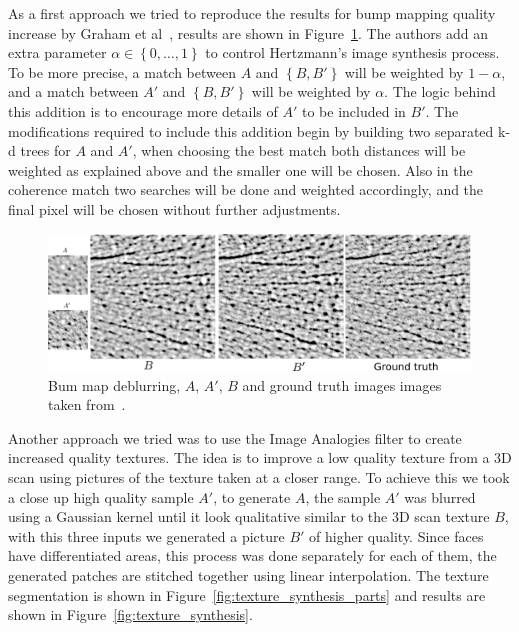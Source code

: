 \documentclass[11pt]{report}
\begin{document}
As a first approach we tried to reproduce the results for bump mapping quality increase by Graham et al~\cite{Graham2013}, results are shown in Figure~\ref{fig:bump_maps}.
The authors add an extra parameter $\alpha \in \left\lbrace 0, \ldots, 1 \right\rbrace$ to control Hertzmann's image synthesis process.
To be more precise, a match between $A$ and $\left\lbrace B,B' \right\rbrace$ will be weighted by $1 - \alpha$, and a match between $A'$ and $\left\lbrace B,B' \right\rbrace$ will be weighted by $\alpha$.
The logic behind this addition is to encourage more details of $A'$ to be included in $B'$.
The modifications required to include this addition begin by building two separated k-d trees for $A$ and $A'$, when choosing the best match both distances will be weighted as explained above and the smaller one will be chosen.
Also in the coherence match two searches will be done and weighted accordingly, and the final pixel will be chosen without further adjustments.

\begin{figure}[htbp!]
\centering
\includegraphics[width=\textwidth]{img/bump_maps}
	\caption{ Bum map deblurring, $A$, $A'$, $B$ and ground truth images images taken from~\cite{Graham2013}.}
	\label{fig:bump_maps}
\end{figure}

Another approach we tried was to use the Image Analogies filter to create increased quality textures.
The idea is to improve a low quality texture from a 3D scan using pictures of the texture taken at a closer range.
To achieve this we took a close up high quality sample $A'$, to generate $A$, the sample $A'$ was blurred using a Gaussian kernel until it look qualitative similar to the 3D scan texture $B$, with this three inputs we generated a picture $B'$ of higher quality.
Since faces have differentiated areas, this process was done separately for each of them, the generated patches are stitched together using linear interpolation.
The texture segmentation is shown in Figure~\ref{fig:texture_synthesis_parts} and results are shown in Figure~\ref{fig:texture_synthesis}.
\end{document}
